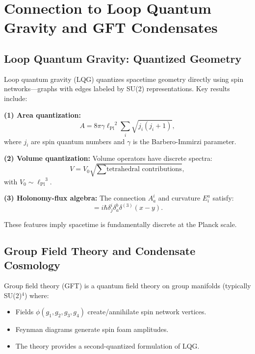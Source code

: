 \documentclass[11pt,a4paper]{article}
\newcommand{\lPl}{\ensuremath{\ell_{\mathrm{Pl}}}}
\theoremstyle{definition}
\theoremstyle{remark}
\begin{document}
\section{Connection to Loop Quantum Gravity and GFT Condensates}
\label{sec:lqg_gft}

\subsection{Loop Quantum Gravity: Quantized Geometry}
\label{sec:lqg_basics}

Loop quantum gravity (LQG) \cite{Rovelli2004,Ashtekar2004} quantizes spacetime geometry directly using spin networks---graphs with edges labeled by SU(2) representations. Key results include:

\textbf{(1) Area quantization:}
\begin{equation}
\label{eq:area_quant}
A = 8\pi \gamma \lPl^2 \sum_i \sqrt{j_i(j_i + 1)},
\end{equation}
where $j_i$ are spin quantum numbers and $\gamma$ is the Barbero-Immirzi parameter.

\textbf{(2) Volume quantization:} Volume operators have discrete spectra:
\begin{equation}
V = V_0 \sqrt{\sum \text{tetrahedral contributions}},
\end{equation}
with $V_0 \sim \lPl^3$.

\textbf{(3) Holonomy-flux algebra:} The connection $A_a^i$ and curvature $E^a_i$ satisfy:
\begin{equation}
[A_a^i(x), E^b_j(y)] = i\hbar \delta^i_j \delta^b_a \delta^{(3)}(x-y).
\end{equation}

These features imply spacetime is fundamentally discrete at the Planck scale.

\subsection{Group Field Theory and Condensate Cosmology}
\label{sec:gft}

Group field theory (GFT) \cite{Oriti2014} is a quantum field theory on group manifolds (typically SU(2)$^4$) where:
\begin{itemize}
\item Fields $\phi(g_1, g_2, g_3, g_4)$ create/annihilate spin network vertices.
\item Feynman diagrams generate spin foam amplitudes.
\item The theory provides a second-quantized formulation of LQG.
\end{itemize}
\end{document}
